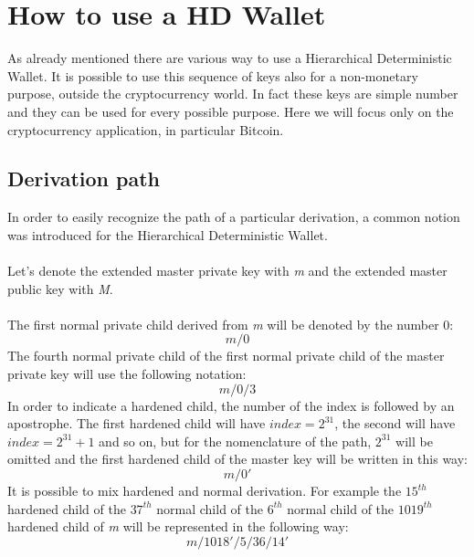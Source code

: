 
\chapter{How to use a HD Wallet} %

\label{bip32} %



As already mentioned there are various way to use a Hierarchical Deterministic Wallet. It is possible to use this sequence of keys also for a non-monetary purpose, outside the cryptocurrency world. In fact these keys are simple number and they can be used for every possible purpose. Here we will focus only on the cryptocurrency application, in particular Bitcoin.

\section{Derivation path}
In order to easily recognize the path of a particular derivation, a common notion was introduced for the Hierarchical Deterministic Wallet.
\\ \\
Let's denote the extended master private key with \textit{m} and the extended master public key with \textit{M}.
\\ \\
The first normal private child derived from \textit{m} will be denoted by the number $0$:
\begin{equation*}
m /0
\end{equation*}
The fourth normal private child of the first normal private child of the master private key will use the following notation:
\begin{equation*}
m /0/3
\end{equation*}
In order to indicate a hardened child, the number of the index is followed by an apostrophe. The first hardened child will have $index=2^{31}$, the second will have $index=2^{31}+1$ and so on, but for the nomenclature of the path, $2^{31}$ will be omitted and the first hardened child of the master key will be written in this way: 
\begin{equation*}
m /0' 
\end{equation*}
It is possible to mix hardened and normal derivation. For example the $15^{th}$ hardened child of the $37^{th}$ normal child of the $6^{th}$ normal child of the $1019^{th}$ hardened child of \textit{m} will be represented in the following way:
\begin{equation*}
m /1018'/5/36/14'
\end{equation*}

